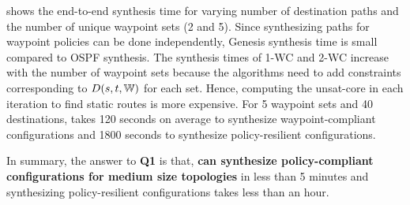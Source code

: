 
 shows the end-to-end synthesis
 time for varying number of destination paths and the 
 number of unique waypoint sets (2 and 5). 
 Since synthesizing paths
 for waypoint policies can be done independently,
Genesis synthesis time is small compared to OSPF synthesis. 
The synthesis times of 1-WC and 2-WC 
increase with the number of waypoint sets because
the algorithms 
need to add constraints corresponding to $D(s,t,\mathbb{W})$ 
for each set. Hence, computing the unsat-core in each
iteration to find static routes is more expensive. 
For 5 waypoint sets and 40 destinations, \name takes 120 
seconds on average to synthesize waypoint-compliant configurations
and 1800 seconds to synthesize policy-resilient configurations.

In summary, the answer to \textbf{Q1} is that,
\textbf{\name can synthesize policy-compliant configurations for medium size
topologies} in less than 5 minutes and synthesizing policy-resilient 
configurations takes less than an hour.


